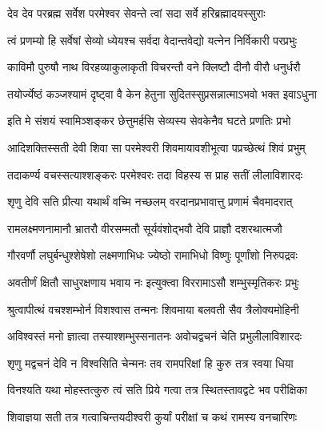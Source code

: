 \twolineshloka
{देव देव परब्रह्म सर्वेश परमेश्वर}
{सेवन्ते त्वां सदा सर्वे हरिब्रह्मादयस्सुराः} %

\twolineshloka
{त्वं प्रणम्यो हि सर्वेषां सेव्यो ध्येयश्च सर्वदा}
{वेदान्तवेद्यो यत्नेन निर्विकारी परप्रभुः} %

\twolineshloka
{काविमौ पुरुषौ नाथ विरहव्याकुलाकृती}
{विचरन्तौ वने क्लिष्टौ दीनौ वीरौ धनुर्धरौ} %

\twolineshloka
{तयोर्ज्येष्ठं कञ्जश्यामं दृष्ट्वा वै केन हेतुना}
{सुदितस्सुप्रसन्नात्माऽभवो भक्त इवाऽधुना} %

\twolineshloka
{इति मे संशयं स्वामिञ्शङ्कर छेत्तुमर्हसि}
{सेव्यस्य सेवकेनैव घटते प्रणतिः प्रभो} %


\twolineshloka
{आदिशक्तिस्सती देवी शिवा सा परमेश्वरी}
{शिवमायावशीभूत्वा पप्रच्छेत्थं शिवं प्रभुम्} %

\twolineshloka
{तदाकर्ण्य वचस्सत्याश्शङ्करः परमेश्वरः}
{तदा विहस्य स प्राह सतीं लीलाविशारदः} %


\twolineshloka
{शृणु देवि सति प्रीत्या यथार्थं वच्मि नच्छलम्}
{वरदानप्रभावात्तु प्रणामं चैवमादरात्} %

\twolineshloka
{रामलक्ष्मणनामानौ भ्रातरौ वीरसम्मतौ}
{सूर्यवंशोद्भवौ देवि प्राज्ञौ दशरथात्मजौ} %

\twolineshloka
{गौरवर्णौ लघुर्बन्धुश्शेषेशो लक्ष्मणाभिधः}
{ज्येष्ठो रामाभिधो विष्णुः पूर्णांशो निरुपद्रवः} %

\twolineshloka
{अवतीर्णं क्षितौ साधुरक्षणाय भवाय नः}
{इत्युक्त्वा विररामाऽसौ शम्भुस्मृतिकरः प्रभुः} %

\twolineshloka
{श्रुत्वापीत्थं वचश्शम्भोर्न विशश्वास तन्मनः}
{शिवमाया बलवती सैव त्रैलोक्यमोहिनी} %

\twolineshloka
{अविश्वस्तं मनो ज्ञात्वा तस्याश्शम्भुस्सनातनः}
{अवोचद्वचनं चेति प्रभुलीलाविशारदः} %


\twolineshloka
{शृणु मद्वचनं देवि न विश्वसिति चेन्मनः}
{तव रामपरिक्षां हि कुरु तत्र स्वया धिया} %

\twolineshloka
{विनश्यति यथा मोहस्तत्कुरु त्वं सति प्रिये}
{गत्वा तत्र स्थितस्तावद्वटे भव परीक्षिका}%


\twolineshloka
{शिवाज्ञया सती तत्र गत्वाचिन्तयदीश्वरी}
{कुर्यां परीक्षां च कथं रामस्य वनचारिणः} %

